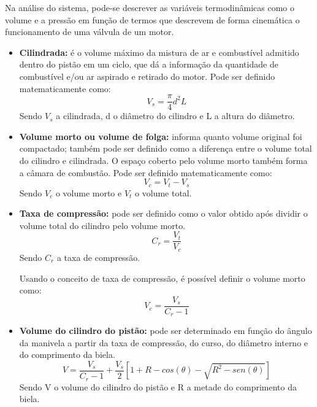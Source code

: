 \documentclass[10pt, conference, letterpaper]{IEEEtran}
\begin{document}
Na análise do sistema, pode-se descrever as variáveis termodinâmicas como o volume e a pressão em função de termos que descrevem de forma cinemática o funcionamento de uma válvula de um motor.
\newline
\begin{itemize}

    \item \textbf{Cilindrada:} é o volume máximo da mistura de ar e combustível admitido dentro do pistão em um ciclo, que dá a informação da quantidade de combustível e/ou ar aspirado e retirado do motor. Pode ser definido matematicamente como: 
    \begin{equation}
    V_s=\frac{\pi}{4}d^2L\label{12}    
    \end{equation}
    Sendo $V_s$ a cilindrada, d o diâmetro do cilindro e L a altura do diâmetro.\newline

    \item \textbf{Volume morto ou volume de folga:} informa quanto volume original foi compactado; também pode ser definido como a diferença entre o volume total do cilindro e cilindrada. O espaço coberto pelo volume morto também forma a câmara de combustão. Pode ser definido matematicamente como:
    \begin{equation}
    V_c= V_t-V_s\label{13}
    \end{equation}
    Sendo $V_c$ o volume morto e $V_t$ o volume total.\newline

    \item \textbf{Taxa de compressão:} pode ser definido como o valor obtido após dividir o volume total do cilindro pelo volume morto.
    \begin{equation}
    C_r=\frac{V_t}{V_c}\label{14}
    \end{equation}
    Sendo $C_r$ a taxa de compressão.\newline

    Usando o conceito de taxa de compressão, é possível definir o volume morto como:
    \begin{equation}
    V_c=\frac{V_s}{C_r-1}\label{15}
    \end{equation}

    \item \textbf{Volume do cilindro do pistão:} pode ser determinado em função do ângulo da manivela a partir da taxa de compressão, do curso, do diâmetro interno e do comprimento da biela. 
    \begin{equation}
    V=\frac{V_s}{C_r-1}+\frac{V_s}{2}[1+R-cos(\theta)-\sqrt{R^2-sen(\theta)}]\label{16}
    \end{equation}
    Sendo V o volume do cilindro do pistão e R a metade do comprimento da biela.

\end{itemize}
\end{document}

